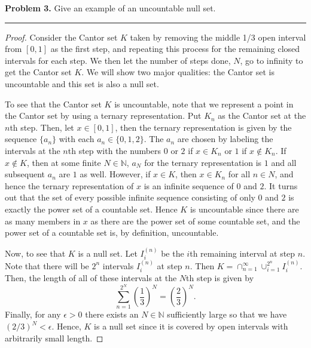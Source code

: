 \documentclass[leqno]{article}
\theoremstyle{nonumberplain}
\newtheorem{proof}{Proof}
\newcommand{\N}{\mathbb{N}}
\begin{document}
\pagebreak


\noindent\textbf{Problem 3.} \quad
Give an example of an uncountable null set.

\noindent\rule[0.5ex]{\linewidth}{1pt}

\begin{proof}
Consider the Cantor set $K$ taken by removing the middle 1/3 open interval from $[0,1]$ as the first step, and repeating this process for the remaining closed intervals for each step. We then let the number of steps done, $N$, go to infinity to get the Cantor set $K$.  We will show two major qualities: the Cantor set is uncountable and this set is also a null set.

To see that the Cantor set $K$ is uncountable, note that we represent a point in the Cantor set by using a ternary representation. Put $K_n$ as the Cantor set at the $n$th step. Then, let $x\in [0,1]$, then the ternary representation is given by the sequence $\{a_n\}$ with each $a_n\in \{0,1,2\}$. The $a_n$ are chosen by labeling the intervals at the $n$th step with the numbers $0$ or $2$ if $x\in K_n$ or $1$ if $x\notin K_n$. If $x\notin K$, then at some finite $N\in \N$, $a_N$ for the ternary representation is $1$ and all subsequent $a_n$ are $1$ as well.  However, if $x\in K$, then $x\in K_n$ for all $n\in N$, and hence the ternary representation of $x$ is an infinite sequence of $0$ and $2$.  It turns out that the set of every possible infinite sequence consisting of only $0$ and $2$ is exactly the power set of a countable set.  Hence $K$ is uncountable since there are as many members in $x$ as there are the power set of some countable set, and the power set of a countable set is, by definition, uncountable.

Now, to see that $K$ is a null set.  Let $I_i^{(n)}$ be the $i$th remaining interval at step $n$. Note that there will be $2^n$ intervals $I_i^{(n)}$ at step $n$. Then $\displaystyle K=\cap_{n=1}^\infty \cup_{i=1}^{2^n} I_i^{(n)}$.   Then, the length of all of these intervals at the $N$th step is given by
\[
\sum_{n=1}^{2^N} \left( \frac{1}{3} \right)^N = \left( \frac{2}{3} \right)^N.
\]
Finally, for any $\epsilon>0$ there exists an $N\in \N$ sufficiently large so that we have $(2/3)^N<\epsilon$.  Hence, $K$ is a null set since it is covered by open intervals with arbitrarily small length.
\end{proof}
\end{document}
